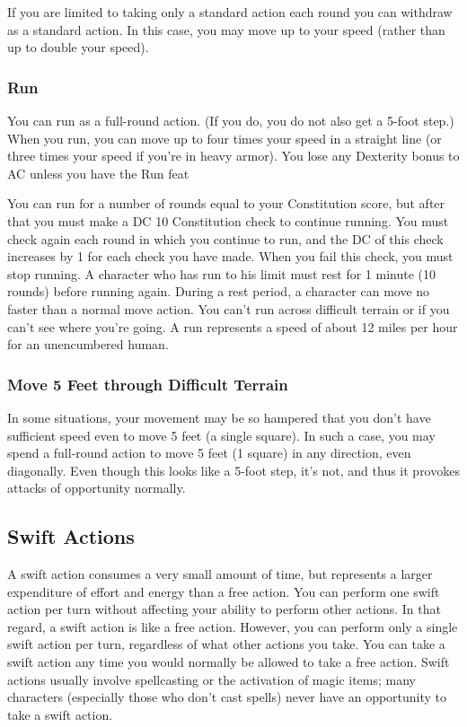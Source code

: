 \vspace*{10pt}

If you are limited to taking only a standard action each round you can withdraw as a standard action. In this case, you may move up to your speed (rather than up to double your speed).

\subsubsection{Run}

You can run as a full-round action. (If you do, you do not also get a 5-foot step.) When you run, you can move up to four times your speed in a straight line (or three times your speed if you're in heavy armor). You lose any Dexterity bonus to AC unless you have the Run feat 

You can run for a number of rounds equal to your Constitution score, but after that you must make a DC 10 Constitution check to continue running. You must check again each round in which you continue to run, and the DC of this check increases by 1 for each check you have made. When you fail this check, you must stop running. A character who has run to his limit must rest for 1 minute (10 rounds) before running again. During a rest period, a character can move no faster than a normal move action.
You can't run across difficult terrain or if you can't see where you're going.
A run represents a speed of about 12 miles per hour for an unencumbered human.

\subsubsection{Move 5 Feet through Difficult Terrain}

In some situations, your movement may be so hampered that you don't have sufficient speed even to move 5 feet (a single square). In such a case, you may spend a full-round action to move 5 feet (1 square) in any direction, even diagonally. Even though this looks like a 5-foot step, it's not, and thus it provokes attacks of opportunity normally.

\subsection{Swift Actions}

A swift action consumes a very small amount of time, but represents a larger expenditure of effort and energy than a free action. You can perform one swift action per turn without affecting your ability to perform other actions. In that regard, a swift action is like a free action. However, you can perform only a single swift action per turn, regardless of what other actions you take. You can take a swift action any time you would normally be allowed to take a free action. Swift actions usually involve spellcasting or the activation of magic items; many characters (especially those who don't cast spells) never have an opportunity to take a swift action.


